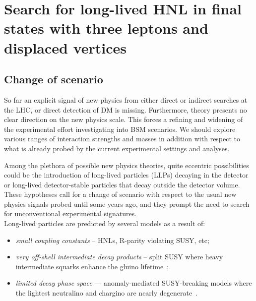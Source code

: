 \chapter{Search for long-lived HNL in final states
with three leptons and displaced vertices} \label{Chapter6} 

\section{Change of scenario}

So far an explicit signal of new physics from either direct or indirect
searches at the LHC, or direct detection of DM is
missing. Furthermore, theory presents no clear direction on the new physics scale.
This forces a refining and widening of the experimental effort
investigating into BSM scenarios. We should explore various ranges of
interaction strengths and masses in addition with respect to
what is already probed by the current experimental
settings and analyses.

Among the plethora of possible new physics theories, quite eccentric
possibilities could be the introduction of long-lived particles (LLPs)
decaying in the detector or long-lived detector-stable particles that decay outside the detector volume. 
These hypotheses call for a change of scenario with respect to the usual
new physics signals probed until some years ago, and they prompt
the need to search for unconventional experimental signatures.\\
Long-lived particles are predicted by several models as a result of:
\begin{itemize}
\item \emph{small coupling constants} -- \eg HNLs, %
  R-parity violating SUSY, %
  etc;
\item \emph{very off-shell intermediate decay products} -- \eg split SUSY where
heavy intermediate squarks enhance
the gluino lifetime~\cite{ATLAS-CONF-2019-006,2020135114};
\item \emph{limited decay phase space} --- \eg
anomaly-mediated SUSY-breaking
models where the lightest neutralino
and chargino are nearly degenerate~\cite{Sirunyan:2019wau,Sirunyan:2019gut}.
\end{itemize}

